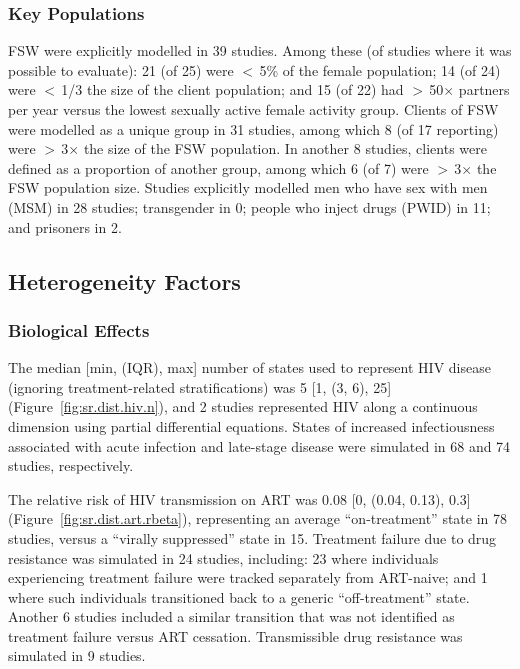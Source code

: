 \subsubsection{Key Populations}\label{sr.res.context.kp}
FSW were explicitly modelled in 39 studies.
Among these (of studies where it was possible to evaluate):
21 (of 25) were {$<$\,5\%} of the female population;
14 (of 24) were {$<$\,1/3} the size of the client population; and
15 (of 22) had {$>$\,50$\times$} partners per year versus
the lowest sexually active female activity group.
Clients of FSW were modelled as a unique group in 31 studies,
among which 8 (of 17 reporting) were {$>$\,3$\times$} the size of the FSW population.
In another 8 studies, clients were defined as a proportion of another group,
among which 6 (of 7) were {$>$\,3$\times$} the FSW population size.
Studies explicitly modelled men who have sex with men (MSM) in 28 studies;
transgender in 0; people who inject drugs (PWID) in 11; and prisoners in 2.
\subsection{Heterogeneity Factors}\label{sr.res.factors}
\subsubsection{Biological Effects}\label{sr.res.factors.bio}
The median [min, (IQR), max] number of states used to represent HIV disease
(ignoring treatment-related stratifications) was 5 [1, (3, 6), 25] (Figure~\ref{fig:sr.dist.hiv.n}),
and 2 studies represented HIV along a continuous dimension using partial differential equations.
States of increased infectiousness associated with acute infection and late-stage disease
were simulated in 68 and 74 studies, respectively.
\par
The relative risk of HIV transmission on ART was 0.08 [0, (0.04, 0.13), 0.3]
(Figure~\ref{fig:sr.dist.art.rbeta}),
representing an average ``on-treatment'' state in 78 studies,
versus a ``virally suppressed'' state in 15.
Treatment failure due to drug resistance was simulated in 24 studies, including:
23 where individuals experiencing treatment failure were tracked separately from ART-naive;
and 1 where such individuals transitioned back to a generic ``off-treatment'' state.
Another 6 studies included a similar transition
that was not identified as treatment failure versus ART cessation.
Transmissible drug resistance was simulated in 9 studies.
